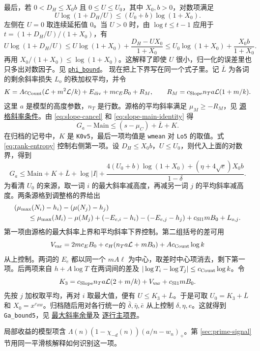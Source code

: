 \documentclass[UTF8,fontset=none,a4paper,11pt]{ctexart}
\theoremstyle{definition}
\newcommand{\src}[3]{\href{https://github.com/leanprover-community/riemann-hypothesis/blob/23aebbb302010b292314d406aa97f7901d698634/src/#1.lean\#L#2}{#3}}
\begin{document}
最后，若 $0<D_H\le X_0b$ 且 $0\le U\le U_0$，其中 $X_0,b>0$，对数项满足
\[
 U\log(1+D_H/U)\le (U_0+b)\log(1+X_0).
\]
左侧在 $U=0$ 取连续延拓值 $0$。当 $U>0$ 时，由 $\log t\le t-1$ 应用于 $t=(1+D_H/U)/(1+X_0)$，有
\[
 U\log(1+D_H/U)
 \le U\log(1+X_0)+\frac{D_H-U X_0}{1+X_0}
 \le U_0\log(1+X_0)+\frac{X_0 b}{1+X_0}.
\]
再用 $X_0/(1+X_0)\le\log(1+X_0)$。这解释了即使 $U$ 很小，归一化的误差里也只多出对数因子。见
\src{Formalism/RankGapBounds/RankGapProofs/WeightedMeanData}{81}{\texttt{phi\_bound}}。
现在把上下界写在同一个式子里。记 $\overline L$ 为各词的剩余斜率损失 $L_o$ 的秩加权平均，并令
\[
 K=A c_{\rm Count}(\mathcal L+m^2\mathcal L/k)
       +E_{\rm div}+mc_E B_0+R_M,\qquad
 R_M=c_{\rm Slope} n_T a\mathcal L(1+m/k).
\]
这里 $a$ 是模型的高度参数，$n_T$ 是行数。源格的平均斜率满足 $\mu_M\ge -R_M$，见
\src{Formalism/RankGapBounds/MeanBoundSecondForm}{139}{源格斜率条件}。由 \eqref{eq:slope-cancel} 和 \eqref{eq:slope-main-identity} 得
\[
 G_a-\mathrm{Main}\le(s-\mu_C)+\overline L+K.
\]
在归档的记号中，$K$ 是 \texttt{K0v5}，最后一项均值是 \texttt{wmean} 对 \texttt{Lo5} 的取值。式 \eqref{eq:rank-entropy} 控制右侧第一项。设 $D_H\le X_0b$，$U\le U_0$，则代入上面的对数界，得到
\[
 G_a\le\mathrm{Main}+K+\overline L+\log|I|
 +\frac{4(U_0+b)\log(1+X_0)+(\eta+4\sqrt e)X_0b}{1-\delta}.
\]
为看清 $U_0$ 的来源，取一词 $i$ 的最大斜率减高度，再减另一词 $j$ 的平均斜率减高度。两条源格到调整格的界给出
\begin{align*}
 &(\mu_{\max}(N_i)-h_i)-(\mu(N_j)-h_j)\\
 &\qquad\le\mu_{\max}(M_i)-\mu(M_j)
       +(-E_{e,i}-h_i)-(-E_{e,j}-h_j)
       +c_{\rm Sl1}mB_0+L_{o,j}.
\end{align*}
第一项由源格的最大斜率上界和平均斜率下界控制。第二组括号的差可用
\[
 V_{\rm var}=2mc_EB_0+c_H(n_T a\mathcal L+mB_0)
                    +A c_{\rm Count}\log k
\]
从上控制。两词的 $E_e$ 都以同一个 $mA\ell$ 为中心，取差时中心项消去，剩下第一项。后两项来自 $h+A\log T$ 在两词间的差及 $|\log T_i-\log T_j|\le c_{\rm Count}\log k$。令
\[
 K_3=c_{\rm Slope}n_T a\mathcal L(2+m/k)+V_{\rm var}+c_{\rm Sl1}mB_0 .
\]
先按 $j$ 加权取平均，再对 $i$ 取最大值，便有 $U\le K_3+\overline L$。于是可取 $U_0=K_3+\overline L$ 和 $X_0=x^{c_{HH}}$。归档随后用对各行统一的 $\bar\delta,\bar\eta,\bar e$ 从上控制 $\delta,\eta,e$。这就得到 \texttt{Ga\_bound5}，见
\src{Formalism/SizeWindowBrackets/ChainSlopeWindows/LevelOfCongruence}{82}{最大斜率余量}及
\src{Formalism/SizeWindowBrackets/ChainSlopeWindows/LevelOfCongruence}{113}{逐行主项界}。

局部收益的模型项含
$\Lambda(n)(1-\chi_{-d}(n))(a/n-w_n)_+$。第 \ref{sec:prime-signal} 节用同一平滑核解释如何识别这一项。
\end{document}
